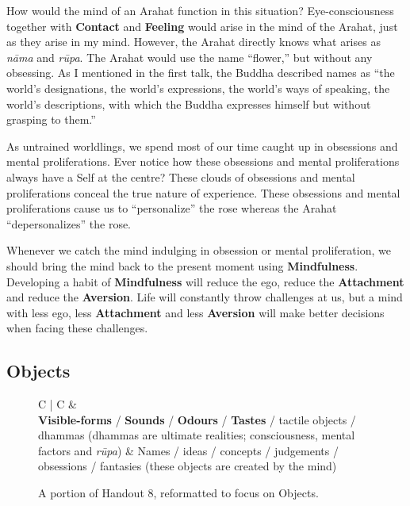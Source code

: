 How would the mind of an Arahat function in this situation? Eye-consciousness together with \textbf{Contact} and \textbf{Feeling} would arise in the mind of the Arahat, just as they arise in my mind. However, the Arahat directly knows what arises as \textit{nāma} and \textit{rūpa}. The Arahat would use the name “flower,” but without any obsessing. As I mentioned in the first talk, the Buddha described names as “the world’s designations, the world’s expressions, the world’s ways of speaking, the world’s descriptions, with which the Buddha expresses himself but without grasping to them.”

As untrained worldlings, we spend most of our time caught up in obsessions and mental proliferations. Ever notice how these obsessions and mental proliferations always have a Self at the centre? These clouds of obsessions and mental proliferations conceal the true nature of experience. These obsessions and mental proliferations cause us to “personalize” the rose whereas the Arahat “depersonalizes” the rose.

Whenever we catch the mind indulging in obsession or mental proliferation, we should bring the mind back to the present moment using \textbf{Mindfulness}. Developing a habit of \textbf{Mindfulness} will reduce the ego, reduce the \textbf{Attachment} and reduce the \textbf{Aversion}. Life will constantly throw challenges at us, but a mind with less ego, less \textbf{Attachment} and less \textbf{Aversion} will make better decisions when facing these challenges.

\subsection*{Objects}

\begin{figure}[H]
\begin{tabular*}{\textwidth}{C{\tabcolsep} | C{\tabcolsep}}
\toprule
{} &  \\
\midrule
\textbf{Visible-forms} / \textbf{Sounds} / \textbf{Odours} / \textbf{Tastes} / tactile objects / dhammas\newline
 (dhammas are ultimate realities; consciousness, mental factors and \textit{rūpa})
 &
 Names / ideas / concepts / judgements / obsessions / fantasies\newline
 (these objects are created by the mind)
 \\
 
\bottomrule
\end{tabular*}
\caption{A portion of Handout 8, reformatted to focus on Objects.}
\end{figure}

